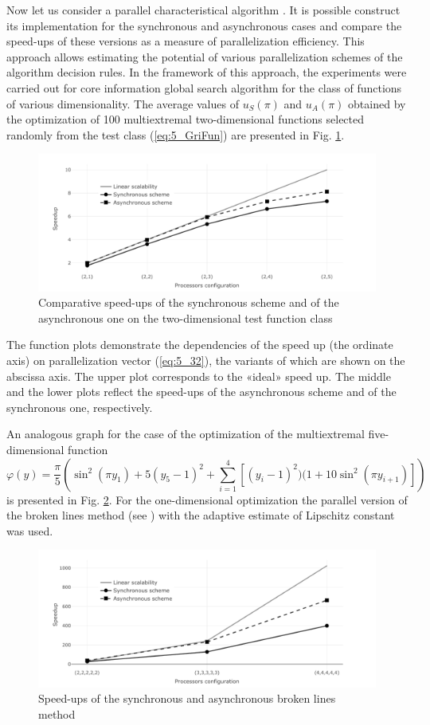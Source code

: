Now let us consider a parallel characteristical algorithm \cite{5_GrishaginSergeyevStrongin}. It is possible construct its implementation for the synchronous and asynchronous cases and compare the speed-ups of these versions as a measure of parallelization efficiency. This approach allows estimating the potential of various parallelization schemes of the algorithm decision rules. In the framework of this approach, the experiments were carried out for core information global search algorithm \cite{5_StrSergMon2000} for the  class of functions of various dimensionality. The average values of $u_S(\pi)$ and $u_A(\pi)$ obtained by the optimization of 100 multiextremal two-dimensional functions selected randomly from the test class (\ref{eq:5_GriFun}) are presented in Fig. \ref{fig:5_7}. 
\begin{figure}[t]
\centering
\includegraphics[width=0.8\linewidth]{figures/figure_5_7.pdf}
\caption{Comparative speed-ups of the synchronous scheme and of the asynchronous one on the two-dimensional test function class}
\label{fig:5_7}    
\end{figure}
The function plots demonstrate the dependencies of the speed up (the ordinate axis) on parallelization vector (\ref{eq:5_32}), the variants of which are shown on the abscissa axis. The upper plot corresponds to the «ideal» speed up. The middle and the lower plots reflect the speed-ups of the asynchronous scheme and of the synchronous one, respectively. 

An analogous graph for the case of the optimization of the multiextremal five-dimensional function
\begin{displaymath}
\varphi(y)=\frac{\pi}{5}\left(\sin^2(\pi y_1)+5(y_5-1)^2+\sum_{i=1}^4{[(y_i-1)^2)(1+10\sin^2(\pi y_{i+1})]}    \right)
\end{displaymath}
is presented in Fig. \ref{fig:5_8}. For the one-dimensional optimization the parallel version of the broken lines method (see \cite{5_GriKvaMukhStr, 5_Piyavskij}) with the adaptive estimate of Lipschitz constant was used.
\begin{figure}[t]
\centering
\includegraphics[width=0.8\linewidth]{figures/figure_5_8.pdf}
\caption{Speed-ups of the synchronous and asynchronous broken lines method}
\label{fig:5_8}    
\end{figure}

